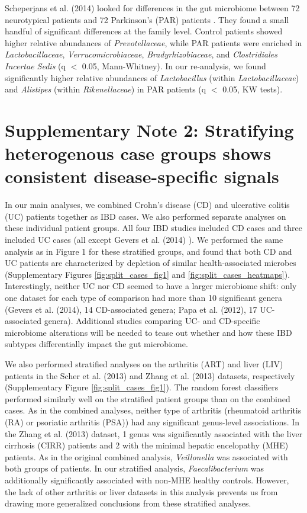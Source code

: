 {Scheperjans et al. (2014) looked for differences in the gut microbiome between 72 neurotypical patients and 72 Parkinson's (PAR) patients \cite{par-schep}.
They found a small handful of significant differences at the family level.
Control patients showed higher relative abundances of \textit{Prevotellaceae}, while PAR patients were enriched in \textit{Lactobacillaceae}, \textit{Verrucomicrobiaceae}, \textit{Bradyrhizobiaceae}, and \textit{Clostridiales Incertae Sedis} (q $<$ 0.05, Mann-Whitney).
In our re-analysis, we found significantly higher relative abundances of \textit{Lactobacillus} (within \textit{Lactobacillaceae}) and \textit{Alistipes} (within \textit{Rikenellaceae}) in PAR patients (q $<$ 0.05, KW tests).

\section*{Supplementary Note 2: Stratifying heterogenous case groups shows consistent disease-specific signals}\label{sec:split_cases}

In our main analyses, we combined Crohn's disease (CD) and ulcerative colitis (UC) patients together as IBD cases.
We also performed separate analyses on these individual patient groups.
All four IBD studies included CD cases and three included UC cases (all except Gevers et al. (2014) \cite{ibd-gevers}).
We performed the same analysis as in Figure 1 for these stratified groups, and found that both CD and UC patients are characterized by depletion of similar health-associated microbes (Supplementary Figures \ref{fig:split_cases_fig1} and \ref{fig:split_cases_heatmaps}).
Interestingly, neither UC nor CD seemed to have a larger microbiome shift: only one dataset for each type of comparison had more than 10 significant genera (Gevers et al. (2014), 14 CD-associated genera; Papa et al. (2012), 17 UC-associated genera).
Additional studies comparing UC- and CD-specific microbiome alterations will be needed to tease out whether and how these IBD subtypes differentially impact the gut microbiome.

We also performed stratified analyses on the arthritis (ART) and liver (LIV) patients in the Scher et al. (2013) and Zhang et al. (2013) datasets, respectively \cite{mhe-zhang, ra-littman} (Supplementary Figure \ref{fig:split_cases_fig1}).
The random forest classifiers performed similarly well on the stratified patient groups than on the combined cases.
As in the combined analyses, neither type of arthritis (rheumatoid arthritis (RA) or psoriatic arthritis (PSA)) had any significant genus-level associations.
In the Zhang et al. (2013) dataset, 1 genus was significantly associated with the liver cirrhosis (CIRR) patients and 2 with the minimal hepatic encelopathy (MHE) patients.
As in the original combined analysis, \textit{Veillonella} was associated with both groups of patients.
In our stratified analysis, \textit{Faecalibacterium} was additionally significantly associated with non-MHE healthy controls.
However, the lack of other arthritis or liver datasets in this analysis prevents us from drawing more generalized conclusions from these stratified analyses.

}
